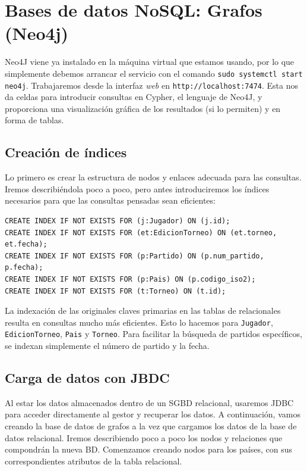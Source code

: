 \section{Bases de datos NoSQL: Grafos (Neo4j)}

Neo4J viene ya instalado en la máquina virtual que estamos usando, por lo que simplemente debemos arrancar el servicio con el comando \texttt{sudo systemctl start neo4j}. Trabajaremos desde la interfaz \textit{web} en \texttt{http://localhost:7474}. Esta nos da celdas para introducir consultas en Cypher, el lenguaje de Neo4J, y proporciona una visualización gráfica de los resultados (si lo permiten) y en forma de tablas. \\

\subsection{Creación de índices}

Lo primero es crear la estructura de nodos y enlaces adecuada para las consultas. Iremos describiéndola poco a poco, pero antes introduciremos los índices necesarios para que las consultas pensadas sean eficientes:

\begin{verbatim}
CREATE INDEX IF NOT EXISTS FOR (j:Jugador) ON (j.id);
CREATE INDEX IF NOT EXISTS FOR (et:EdicionTorneo) ON (et.torneo, et.fecha);
CREATE INDEX IF NOT EXISTS FOR (p:Partido) ON (p.num_partido, p.fecha);
CREATE INDEX IF NOT EXISTS FOR (p:Pais) ON (p.codigo_iso2);
CREATE INDEX IF NOT EXISTS FOR (t:Torneo) ON (t.id);
\end{verbatim}

La indexación de las originales claves primarias en las tablas de relacionales resulta en consultas mucho más eficientes. Esto lo hacemos para \texttt{Jugador}, \texttt{EdicionTorneo}, \texttt{Pais} y \texttt{Torneo}. Para facilitar la búsqueda de partidos específicos, se indexan simplemente el número de partido y la fecha.

\subsection{Carga de datos con JBDC}

Al estar los datos almacenados dentro de un SGBD relacional, usaremos JDBC para acceder directamente al gestor y recuperar los datos. A continuación, vamos creando la base de datos de grafos a la vez que cargamos los datos de la base de datos relacional. Iremos describiendo poco a poco los nodos y relaciones que compondrán la nueva BD. Comenzamos creando nodos para los países, con sus correspondientes atributos de la tabla relacional. 

